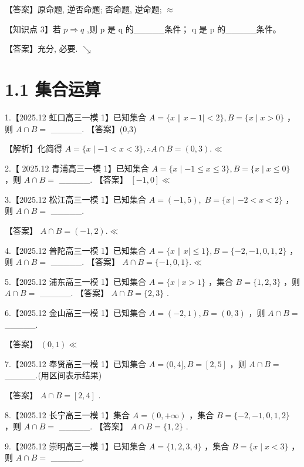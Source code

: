 \documentclass[10pt]{article}
\begin{document}
【答案】原命题, 逆否命题; 否命题, 逆命题; \(\approx\)

【知识点 3】若 \(p \Rightarrow  q\) ,则 \(\mathrm{p}\) 是 \(\mathrm{q}\) 的\_\_\_\_\_条件； \(\mathrm{q}\) 是 \(\mathrm{p}\) 的\_\_\_\_\_条件。

【答案】充分, 必要. \(\searrow\)

\section*{1.1 集合运算}

1.【2025.12 虹口高三一模 1】已知集合 \(A = \{ x\parallel x - 1 \mid   < 2\} ,B = \{ x \mid  x > 0\}\) ，则 \(A \cap  B =\) \_\_\_\_\_. 【答案】(0,3)

【解析】化简得 \(A = \{ x \mid   - 1 < x < 3\} ,\therefore A \cap  B = \left( {0,3}\right) . \ll\)

2.【 2025.12 青浦高三一模 1】已知集合 \(A = \{ x \mid   - 1 \leq  x \leq  3\} ,B = \{ x \mid  x \leq  0\}\) ，则 \(A \cap  B =\) \_\_\_\_\_. 【答案】 \(\left\lbrack  {-1,0}\right\rbrack   \ll\)

3.【2025.12 松江高三一模 1】已知集合 \(A = \left( {-1,5}\right) ,\;B = \{ x \mid   - 2 < x < 2\}\) ，则 \(A \cap  B =\) \_\_\_\_\_.

【答案】 \(A \cap  B = \left( {-1,2}\right) . \ll\)

4.【2025.12 普陀高三一模 1】已知集合 \(A = \{ x\parallel x \mid   \leq  1\} ,B = \{  - 2, - 1,0,1,2\}\) ，则 \(A \cap  B =\) \_\_\_\_\_. 【答案】 \(A \cap  B = \{  - 1,0,1\} . \ll\)

5.【2025.12 浦东高三一模 1】已知集合 \(A = \{ x \mid  x > 1\}\) ，集合 \(B = \{ 1,2,3\}\) ，则 \(A \cap  B =\) \_\_\_\_\_. 【答案】 \(A \cap  B = \{ 2,3\}\) .

6.【2025.12 金山高三一模 1】已知集合 \(A = \left( {-2,1}\right) ,B = \left( {0,3}\right)\) ，则 \(A \cap  B =\) \_\_\_\_\_.

【答案】 \(\left( {0,1}\right)  \ll\)

7.【2025.12 奉贤高三一模 1】已知集合 \(A = (0,4\rbrack ,B = \left\lbrack  {2,5}\right\rbrack\) ，则 \(A \cap  B =\) \_\_\_\_\_.(用区间表示结果)

【答案】 \(A \cap  B = \left\lbrack  {2,4}\right\rbrack\) .

8.【2025.12 长宁高三一模 1】集合 \(A = \left( {0, + \infty }\right)\) ，集合 \(B = \{  - 2, - 1,0,1,2\}\) ，则 \(A \cap  B =\) \_\_\_\_\_. 【答案】 \(A \cap  B = \{ 1,2\}\) .

9.【2025.12 崇明高三一模 1】已知集合 \(A = \{ 1,2,3,4\}\) ，集合 \(B = \{ x \mid  x < 3\}\) ，则 \(A \cap  B =\) \_\_\_\_\_.
\end{document}

